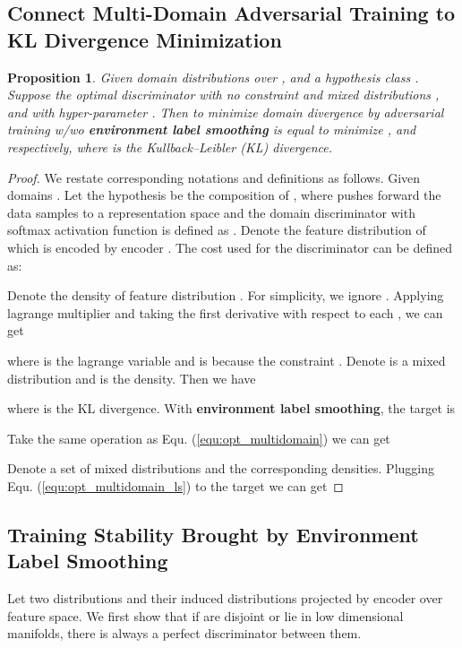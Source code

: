 \documentclass{article} \usepackage{iclr2023_conference,times}
\newtheorem{prop}{Proposition}
\newcommand{\myref}[1]{Equ. (\ref{#1})}
\begin{document}
\subsection{Connect Multi-Domain Adversarial Training to KL Divergence Minimization}\label{sec:ms_ls}
\begin{prop}
Given domain distributions  over , and a hypothesis class . Suppose  the optimal discriminator with no constraint and mixed distributions , and  with hyper-parameter . Then to minimize domain divergence by adversarial training w/wo \textbf{environment label smoothing} is equal to minimize , and  respectively, where  is the Kullback–Leibler (KL) divergence.
\label{prop3}
\end{prop}
\begin{proof}
We restate corresponding notations and definitions as follows. Given  domains . Let the hypothesis  be the composition of , where  pushes forward the data samples to a representation space  and the domain discriminator with softmax activation function is defined as . Denote  the feature distribution of  which is encoded by encoder . The cost used for the discriminator can be defined as:

Denote  the density of feature distribution . For simplicity, we ignore . Applying lagrange multiplier and taking the first derivative with respect to each , we can get

where  is the lagrange variable and  is because the constraint . Denote  is a mixed distribution and  is the density. Then we have


where  is the KL divergence. With \textbf{environment label smoothing}, the target is 

Take the same operation as \myref{equ:opt_multidomain} we can get

Denote  a set of mixed distributions and  the corresponding densities. Plugging \myref{equ:opt_multidomain_ls} to the target we can get

\end{proof}


\subsection{Training Stability Brought by Environment Label Smoothing}\label{sec:app_stable}
Let  two distributions and  their induced distributions projected by encoder  over feature space. We first show that if  are disjoint or lie in low dimensional manifolds, there is always a perfect discriminator between them. 
\end{document}
